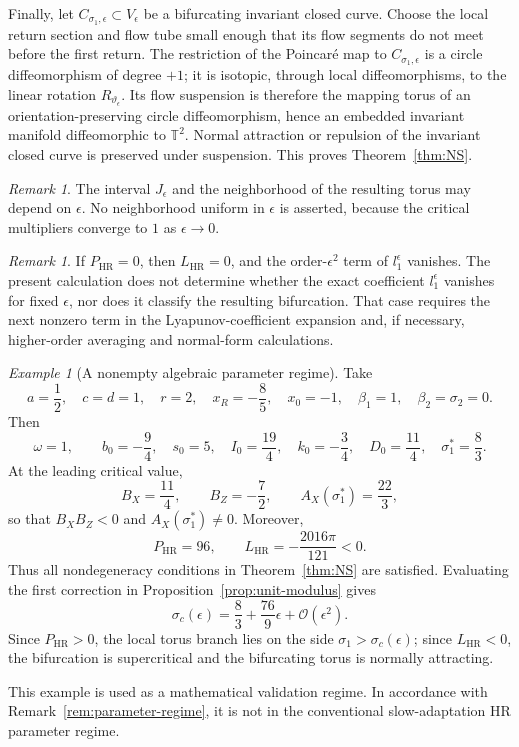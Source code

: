 \documentclass[11pt]{amsart}
\theoremstyle{remark}
\newtheorem{remark}[theorem]{Remark}
\newtheorem{example}[theorem]{Example}
\newcommand{\cO}{\mathcal{O}}
\newcommand{\T}{\mathbb{T}}
\newcommand{\PHR}{P_{\mathrm{HR}}}
\newcommand{\LHR}{L_{\mathrm{HR}}}
\begin{document}
Finally, let \(C_{\sigma_1,\epsilon}\subset V_\epsilon\) be a bifurcating
invariant closed curve.  Choose the local return section and flow tube small
enough that its flow segments do not meet before the first return.  The
restriction of the Poincar\'e map to
\(C_{\sigma_1,\epsilon}\) is a circle diffeomorphism of degree \(+1\); it is
isotopic, through local diffeomorphisms, to the linear rotation
\(R_{\vartheta_\epsilon}\).  Its flow suspension is therefore the mapping
torus of an orientation-preserving circle diffeomorphism, hence an embedded
invariant manifold diffeomorphic to \(\T^2\).  Normal attraction or
repulsion of the invariant closed curve is preserved under suspension.  This
proves Theorem~\ref{thm:NS}.

\begin{remark}
The interval \(J_\epsilon\) and the neighborhood of the resulting torus may
depend on \(\epsilon\).  No neighborhood uniform in \(\epsilon\) is asserted,
because the critical multipliers converge to \(1\) as \(\epsilon\to0\).
\end{remark}

\begin{remark}
If \(\PHR=0\), then \(\LHR=0\), and the order-\(\epsilon^2\) term of
\(l_1^\epsilon\) vanishes.  The present calculation does not determine
whether the exact coefficient \(l_1^\epsilon\) vanishes for fixed
\(\epsilon\), nor does it classify the resulting bifurcation.  That case
requires the next nonzero term in the Lyapunov-coefficient expansion and, if
necessary, higher-order averaging and normal-form calculations.
\end{remark}

\begin{example}[A nonempty algebraic parameter regime]\label{ex:parameters}
Take
\[
 a=\frac12,\quad c=d=1,\quad r=2,\quad x_R=-\frac85,\quad x_0=-1,
 \quad \beta_1=1,\quad \beta_2=\sigma_2=0.
\]
Then
\[
 \omega=1,\qquad
 b_0=-\frac94,\quad s_0=5,\quad I_0=\frac{19}{4},\quad
 k_0=-\frac34,\quad D_0=\frac{11}{4},\quad
 \sigma_1^*=\frac83.
\]
At the leading critical value,
\[
 B_X=\frac{11}{4},\qquad
 B_Z=-\frac72,\qquad
 A_X(\sigma_1^*)=\frac{22}{3},
\]
so that \(B_XB_Z<0\) and \(A_X(\sigma_1^*)\ne0\).  Moreover,
\[
 \PHR=96,\qquad
 \LHR=-\frac{2016\pi}{121}<0.
\]
Thus all nondegeneracy conditions in Theorem~\ref{thm:NS} are satisfied.
Evaluating the first correction in Proposition~\ref{prop:unit-modulus} gives
\begin{equation}\label{eq:example-sigma-c}
 \sigma_c(\epsilon)
 =\frac83+\frac{76}{9}\epsilon+\cO(\epsilon^2).
\end{equation}
Since \(\PHR>0\), the local torus branch lies on the side
\(\sigma_1>\sigma_c(\epsilon)\); since \(\LHR<0\), the bifurcation is
supercritical and the bifurcating torus is normally attracting.

This example is used as a mathematical validation regime.  In accordance
with Remark~\ref{rem:parameter-regime}, it is not in the conventional
slow-adaptation HR parameter regime.
\end{example}
\end{document}
